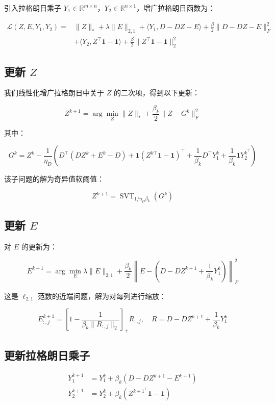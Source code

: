 \documentclass{homework}
\begin{document}
\begin{sol}
    引入拉格朗日乘子 \( Y_1 \in \mathbb{R}^{m \times n} \)，\( Y_2 \in \mathbb{R}^{n \times 1} \)，增广拉格朗日函数为：

\[
\begin{aligned}
\mathcal{L}(Z, E, Y_1, Y_2) = &\|Z\|_* + \lambda \|E\|_{2,1} + \langle Y_1, D - DZ - E \rangle + \frac{\beta}{2} \|D - DZ - E\|_F^2 \\
&+ \langle Y_2, Z^\top \mathbf{1} - \mathbf{1} \rangle + \frac{\beta}{2} \|Z^\top \mathbf{1} - \mathbf{1}\|_2^2
\end{aligned}
\]


\subsection*{更新 \( Z \)}

我们线性化增广拉格朗日中关于 \( Z \) 的二次项，得到以下更新：

\[
Z^{k+1} = \arg\min_Z \|Z\|_* + \frac{\beta_k}{2} \|Z - G^k\|_F^2
\]

其中：

\[
G^k = Z^k - \frac{1}{\eta_D} \left( D^\top (D Z^k + E^k - D) + \mathbf{1}(Z^{k\top} \mathbf{1} - \mathbf{1})^\top + \frac 1{\beta_k}D^\top Y_1^k + \frac 1{\beta_k}\mathbf{1} Y_2^{k^\top} \right)
\]

该子问题的解为奇异值软阈值：

\[
Z^{k+1} = \operatorname{SVT}_{1/\eta_D\beta_k}(G^k)
\]

\subsection*{更新 \( E \)}

对 \( E \) 的更新为：

\[
E^{k+1} = \arg\min_E \lambda \|E\|_{2,1} + \frac{\beta_k}{2} \left\| E - \left(D - D Z^{k+1} + \frac{1}{\beta_k} Y_1^k \right) \right\|_F^2
\]

这是 \( \ell_{2,1} \) 范数的近端问题，解为对每列进行缩放：

\[
E^{k+1}_{:,j} = \left[1 - \frac{1}{\beta_k\|R_{:,j}\|_2} \right]_+ R_{:,j}, \quad R = D - D Z^{k+1} + \frac{1}{\beta_k} Y_1^k
\]

\subsection*{更新拉格朗日乘子}

\[
\begin{aligned}
Y_1^{k+1} &= Y_1^k + \beta_k (D - D Z^{k+1} - E^{k+1}) \\
Y_2^{k+1} &= Y_2^k + \beta_k (Z^{k+1^\top} \mathbf{1} - \mathbf{1})
\end{aligned}
\]


\end{sol}
\end{document}
